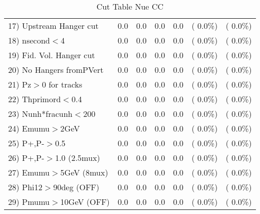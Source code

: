 \begin{table}[h!]
\begin{tabular}{||l||r|r|r|r|r|r||}
 17) Upstream Hanger cut  &          0.0 &          0.0 &          0.0 &          0.0 & (  0.0\%) & (  0.0\%) \\
 18) nsecond$<$4          &          0.0 &          0.0 &          0.0 &          0.0 & (  0.0\%) & (  0.0\%) \\
 19) Fid. Vol. Hanger cut &          0.0 &          0.0 &          0.0 &          0.0 & (  0.0\%) & (  0.0\%) \\
 20) No Hangers fromPVert &          0.0 &          0.0 &          0.0 &          0.0 & (  0.0\%) & (  0.0\%) \\
 21) Pz$>$0 for tracks    &          0.0 &          0.0 &          0.0 &          0.0 & (  0.0\%) & (  0.0\%) \\
 22) Thprimord$<$0.4      &          0.0 &          0.0 &          0.0 &          0.0 & (  0.0\%) & (  0.0\%) \\
 23) Nunh*fracunh$<$200   &          0.0 &          0.0 &          0.0 &          0.0 & (  0.0\%) & (  0.0\%) \\
 24) Emumu$>$2GeV         &          0.0 &          0.0 &          0.0 &          0.0 & (  0.0\%) & (  0.0\%) \\
 25) P+,P-$>$0.5          &          0.0 &          0.0 &          0.0 &          0.0 & (  0.0\%) & (  0.0\%) \\
 26) P+,P-$>$1.0 (2.5mux) &          0.0 &          0.0 &          0.0 &          0.0 & (  0.0\%) & (  0.0\%) \\
 27) Emumu$>$5GeV  (8mux) &          0.0 &          0.0 &          0.0 &          0.0 & (  0.0\%) & (  0.0\%) \\
 28) Phi12$>$90deg  (OFF) &          0.0 &          0.0 &          0.0 &          0.0 & (  0.0\%) & (  0.0\%) \\
 29) Pmumu$>$10GeV  (OFF) &          0.0 &          0.0 &          0.0 &          0.0 & (  0.0\%) & (  0.0\%) \\
 \hline
 \hline
 \end{tabular}
 \caption{Cut Table   Nue CC  }
 \label{tab-cutcohjpsi-mumu_nuecc}
 \end{table}
